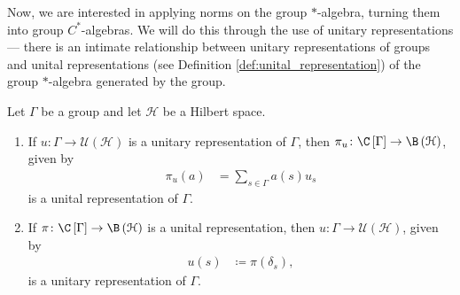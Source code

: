 Now, we are interested in applying norms on the group $\ast$-algebra, turning them into group $C^{\ast}$-algebras. We will do this through the use of unitary representations --- there is an intimate relationship between unitary representations of groups and unital representations (see Definition \ref{def:unital_representation}) of the group $\ast$-algebra generated by the group.
\begin{proposition}
  Let $\Gamma$ be a group and let $\mathcal{H}$ be a Hilbert space.
  \begin{enumerate}[(1)]
    \item If $u\colon \Gamma\rightarrow \mathcal{U}\left( \mathcal{H} \right)$ is a unitary representation of $\Gamma$, then $\pi_u\colon \C\left[ \Gamma \right]\rightarrow \B\left( \mathcal{H} \right)$, given by
      \begin{align*}
        \pi_u(a) &= \sum_{s\in\Gamma}a(s)u_s
      \end{align*}
      is a unital representation of $\Gamma$.
    \item If $\pi\colon \C\left[ \Gamma \right]\rightarrow \B\left( \mathcal{H} \right)$ is a unital representation, then $u\colon \Gamma\rightarrow \mathcal{U}\left( \mathcal{H} \right)$, given by
      \begin{align*}
        u(s) &\coloneq \pi\left( \delta_s \right),
      \end{align*}
      is a unitary representation of $\Gamma$.
  \end{enumerate}
\end{proposition}
